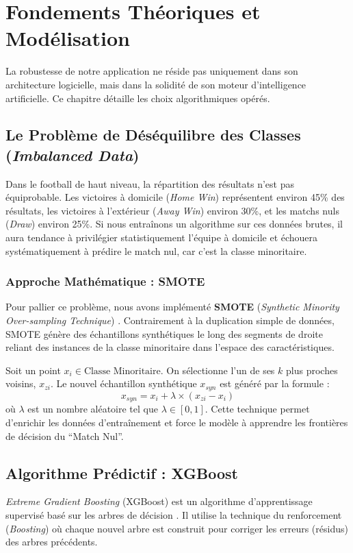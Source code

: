\documentclass[12pt,a4paper,oneside]{book}
\begin{document}
\chapter{Fondements Théoriques et Modélisation}

La robustesse de notre application ne réside pas uniquement dans son architecture logicielle, mais dans la solidité de son moteur d'intelligence artificielle. Ce chapitre détaille les choix algorithmiques opérés.

\section{Le Problème de Déséquilibre des Classes (\textit{Imbalanced Data})}
Dans le football de haut niveau, la répartition des résultats n'est pas équiprobable. Les victoires à domicile (\textit{Home Win}) représentent environ 45\% des résultats, les victoires à l'extérieur (\textit{Away Win}) environ 30\%, et les matchs nuls (\textit{Draw}) environ 25\%.
Si nous entraînons un algorithme sur ces données brutes, il aura tendance à privilégier statistiquement l'équipe à domicile et échouera systématiquement à prédire le match nul, car c'est la classe minoritaire.

\subsection{Approche Mathématique : SMOTE}
Pour pallier ce problème, nous avons implémenté \textbf{SMOTE} (\textit{Synthetic Minority Over-sampling Technique}) \cite{chawla2002smote}. Contrairement à la duplication simple de données, SMOTE génère des échantillons synthétiques le long des segments de droite reliant des instances de la classe minoritaire dans l'espace des caractéristiques.

Soit un point $x_i \in \text{Classe Minoritaire}$. On sélectionne l'un de ses $k$ plus proches voisins, $x_{zi}$. Le nouvel échantillon synthétique $x_{syn}$ est généré par la formule :
\begin{equation}
    x_{syn} = x_i + \lambda \times (x_{zi} - x_i)
\end{equation}
où $\lambda$ est un nombre aléatoire tel que $\lambda \in [0, 1]$. Cette technique permet d'enrichir les données d'entraînement et force le modèle à apprendre les frontières de décision du ``Match Nul''.

\section{Algorithme Prédictif : XGBoost}
\textit{Extreme Gradient Boosting} (XGBoost) est un algorithme d'apprentissage supervisé basé sur les arbres de décision \cite{chen2016xgboost}. Il utilise la technique du renforcement (\textit{Boosting}) où chaque nouvel arbre est construit pour corriger les erreurs (résidus) des arbres précédents.
\end{document}
